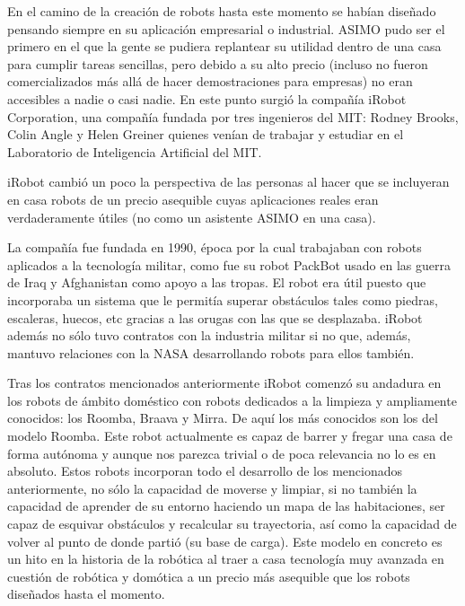 En el camino de la creación de robots hasta este momento se habían diseñado pensando siempre en su aplicación empresarial o industrial. ASIMO pudo ser el primero en el que la gente se pudiera replantear su utilidad dentro de una casa para cumplir tareas sencillas, pero debido a su alto precio (incluso no fueron comercializados más allá de hacer demostraciones para empresas) no eran accesibles a nadie o casi nadie. En este punto surgió la compañía iRobot Corporation, una compañía fundada por tres ingenieros del MIT: Rodney Brooks, Colin Angle y Helen Greiner quienes venían de trabajar y estudiar en el Laboratorio de Inteligencia Artificial del MIT.

iRobot cambió un poco la perspectiva de las personas al hacer que se incluyeran en casa robots de un precio asequible cuyas aplicaciones reales eran verdaderamente útiles (no como un asistente ASIMO en una casa).

La compañía fue fundada en 1990, época por la cual trabajaban con robots aplicados a la tecnología militar, como fue su robot PackBot usado en las guerra de Iraq y Afghanistan como apoyo a las tropas. El robot era útil puesto que incorporaba un sistema que le permitía superar obstáculos tales como piedras, escaleras, huecos, etc gracias a las orugas con las que se desplazaba. iRobot además no sólo tuvo contratos con la industria militar si no que, además, mantuvo relaciones con la NASA desarrollando robots para ellos también.

Tras los contratos mencionados anteriormente iRobot comenzó su andadura en los robots de ámbito doméstico con robots dedicados a la limpieza y ampliamente conocidos: los Roomba, Braava y Mirra. De aquí los más conocidos son los del modelo Roomba. Este robot actualmente es capaz de barrer y fregar una casa de forma autónoma y aunque nos parezca trivial o de poca relevancia no lo es en absoluto. Estos robots incorporan todo el desarrollo de los mencionados anteriormente, no sólo la capacidad de moverse y limpiar, si no también la capacidad de aprender de su entorno haciendo un mapa de las habitaciones, ser capaz de esquivar obstáculos y recalcular su trayectoria, así como la capacidad de volver al punto de donde partió (su base de carga). Este modelo en concreto es un hito en la historia de la robótica al traer a casa tecnología muy avanzada en cuestión de robótica y domótica a un precio más asequible que los robots diseñados hasta el momento.

